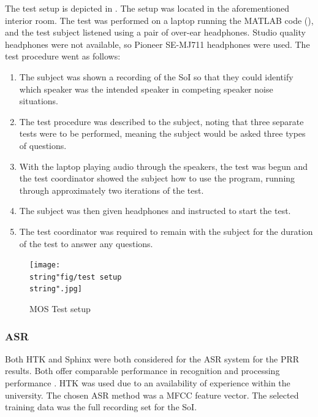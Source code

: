 The test setup is depicted in . The setup
was located in the aforementioned interior room. The test was performed
on a laptop running the MATLAB code (), and the
test subject listened using a pair of over-ear headphones. Studio
quality headphones were not available, so Pioneer SE-MJ711 headphones
were used. The test procedure went as follows:
\begin{enumerate}
\item The subject was shown a recording of the \ac{SoI} so that they could
identify which speaker was the intended speaker in competing speaker
noise situations.
\item The test procedure was described to the subject, noting that three
separate tests were to be performed, meaning the subject would be
asked three types of questions.
\item With the laptop playing audio through the speakers, the test was begun
and the test coordinator showed the subject how to use the program,
running through approximately two iterations of the test.
\item The subject was then given headphones and instructed to start the
test.
\item The test coordinator was required to remain with the subject for the
duration of the test to answer any questions.
\end{enumerate}
\begin{figure}
\begin{centering}
\texttt{[image: \\string"fig/test setup\\string".jpg]}
\par\end{centering}

\protect\caption{\label{fig:MOS-Test-setup}MOS Test setup}
\end{figure}



\subsubsection*{\acl{ASR}}

Both \ac{HTK} and Sphinx were both considered for the \ac{ASR} system
for the \ac{PRR} results. Both offer comparable performance in recognition
and processing performance \citep{Vertanen2006}. \ac{HTK} was used
due to an availability of experience within the university. The chosen
\ac{ASR} method was a \ac{MFCC} feature vector. The selected training
data was the full recording set for the \ac{SoI}.

